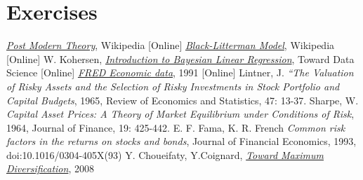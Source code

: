 \section*{Exercises}


\begin{thebibliography}{9}
\href{https://en.wikipedia.org/wiki/Post-modern_portfolio_theory}{\emph{Post Modern Theory}}, Wikipedia [Online]
\href{https://en.wikipedia.org/wiki/Black\%E2\%80\%93Litterman_model}{\emph{Black-Litterman Model}}, Wikipedia [Online]
W. Kohersen, \href{https://towardsdatascience.com/introduction-to-bayesian-linear-regression-e66e60791ea7}{\emph{Introduction to Bayesian Linear Regression}}, Toward Data Science [Online]
\href{https://fred.stlouisfed.org/}{\emph{FRED Economic data}}, 1991 [Online]
 Lintner, J. \emph{“The Valuation of Risky Assets and the Selection of Risky Investments in Stock Portfolio and Capital Budgets}, 1965, Review of Economics and
Statistics, 47: 13-37.
 Sharpe, W. \emph{Capital Asset Prices: A Theory of Market Equilibrium under Conditions of Risk}, 1964, Journal of Finance, 19: 425-442.
 E. F. Fama, K. R. French \emph{Common risk factors in the returns on stocks and bonds}, Journal of Financial Economics, 1993, doi:10.1016/0304-405X(93)
 Y. Choueifaty, Y.Coignard, \href{ https://www.tobam.fr/wp-content/uploads/2014/12/TOBAM-JoPM-Maximum-Div-2008.pdf}{\emph{Toward Maximum Diversification}}, 2008
\end{thebibliography}
